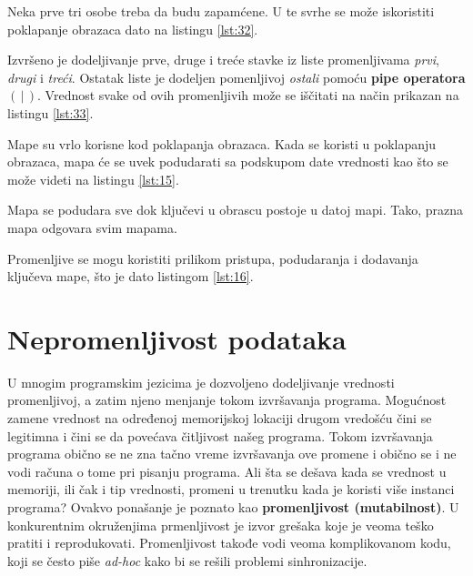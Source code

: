 \documentclass[12pt,oneside]{memoir}
\begin{document}


Neka prve tri osobe treba da budu zapamćene. U te svrhe se može iskoristiti poklapanje obrazaca dato na listingu \ref{lst:32}.



Izvršeno je dodeljivanje prve, druge i treće stavke iz liste promenljivama \textit{prvi}, \textit{drugi} i \textit{treći}. Ostatak liste je dodeljen pomenljivoj \textit{ostali} pomoću \textbf{pipe operatora $(\,|\,)$}. Vrednost svake od ovih promenljivih može se iščitati na način prikazan na listingu \ref{lst:33}.



Mape su vrlo korisne kod poklapanja obrazaca. Kada se koristi u poklapanju obrazaca, mapa će se uvek podudarati sa podskupom date vrednosti kao što se može videti na listingu \ref{lst:15}.
 


\noindent Mapa se podudara sve dok ključevi u obrascu postoje u datoj mapi. Tako, prazna mapa odgovara svim mapama.

Promenljive se mogu koristiti prilikom pristupa, podudaranja i dodavanja ključeva mape, što je dato listingom \ref{lst:16}.



\section{Nepromenljivost podataka}
\label{odeljak:nepromenljivostPodataka}

U mnogim programskim jezicima je dozvoljeno dodeljivanje vrednosti promenljivoj, a zatim njeno menjanje tokom izvršavanja programa. Mogućnost zamene vrednost na određenoj memorijskoj lokaciji drugom vredošću čini se legitimna i čini se da povećava čitljivost našeg programa. Tokom izvršavanja programa obično se ne zna tačno vreme izvršavanja ove promene i obično se i ne vodi računa o tome pri pisanju programa. Ali šta se dešava kada se vrednost u memoriji, ili čak i tip vrednosti, promeni u trenutku kada je koristi više instanci programa?  Ovakvo ponašanje je poznato kao \textbf{promenljivost (mutabilnost)}. U konkurentnim okruženjima prmenljivost je izvor grešaka koje je veoma teško pratiti i reprodukovati. Promenljivost takođe vodi veoma komplikovanom kodu, koji se često piše \textit{ad-hoc} kako bi se rešili problemi sinhronizacije.
\end{document}
